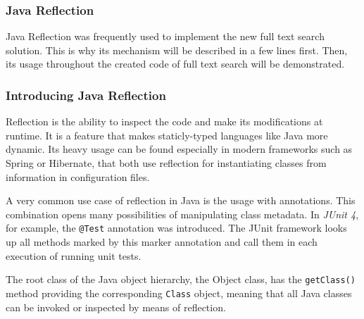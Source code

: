 \subsubsection{Java Reflection}



Java Reflection was frequently used to implement the new full text search solution. 
This is why its mechanism will be described in a few lines first.
Then, its usage throughout the created code of full text search will be demonstrated.

\subsubsection{Introducing Java Reflection}

Reflection is the ability to inspect the code and make its modifications at runtime. 
It is a feature that makes staticly-typed languages like Java more dynamic. 
Its heavy usage can be found especially in modern frameworks such as Spring or Hibernate, that both use reflection for instantiating classes from information in configuration files. 

A very common use case of reflection in Java is the usage with annotations. 
This combination opens many possibilities of manipulating class metadata. 
In \textit{JUnit 4}, for example, the \texttt{@Test} annotation was introduced. 
The JUnit framework looks up all methods marked by this marker annotation and call them in each execution of running unit tests.

The root class of the Java object hierarchy, the Object class, has the \texttt{getClass()} method providing the corresponding \texttt{Class} object, meaning that all Java classes can be invoked or inspected by means of reflection.



